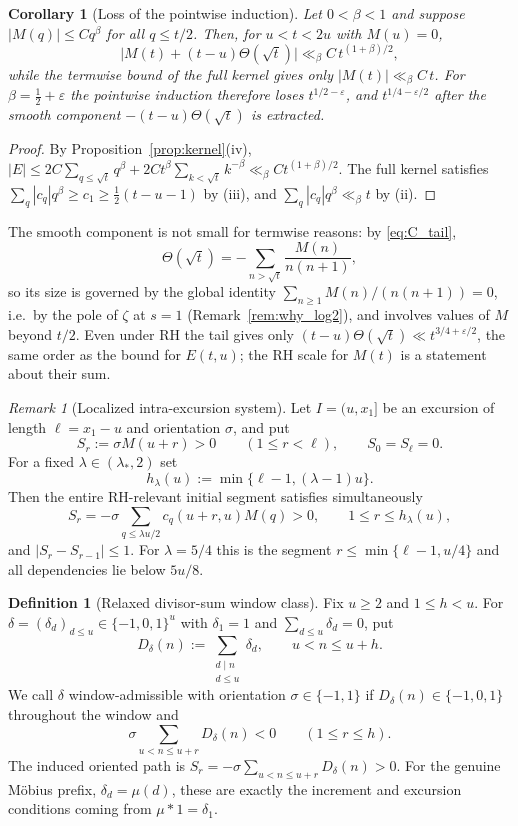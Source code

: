 \documentclass[11pt]{amsart}
\numberwithin{equation}{section}
\theoremstyle{plain}
\newtheorem{corollary}[theorem]{Corollary}
\theoremstyle{definition}
\newtheorem{definition}[theorem]{Definition}
\theoremstyle{remark}
\newtheorem{remark}[theorem]{Remark}
\newcommand{\eps}{\varepsilon}
\begin{document}
\begin{corollary}[Loss of the pointwise induction]
\label{cor:induction-loss}
Let $0<\beta<1$ and suppose $|M(q)|\le Cq^\beta$ for all $q\le t/2$. Then,
for $u<t<2u$ with $M(u)=0$,
\begin{equation}
\label{eq:induction-loss}
\bigl|M(t)+(t-u)\Theta(\sqrt t)\bigr|\ll_\beta C\,t^{(1+\beta)/2},
\end{equation}
while the termwise bound of the full kernel gives only
$|M(t)|\ll_\beta C\,t$. For $\beta=\frac12+\eps$ the pointwise induction
therefore loses $t^{1/2-\eps}$, and $t^{1/4-\eps/2}$ after the smooth
component $-(t-u)\Theta(\sqrt t)$ is extracted.
\end{corollary}

\begin{proof}
By Proposition~\ref{prop:kernel}(iv),
$|E|\le2C\sum_{q\le\sqrt t}q^\beta+2Ct^\beta\sum_{k<\sqrt t}k^{-\beta}
\ll_\beta Ct^{(1+\beta)/2}$. The full kernel satisfies
$\sum_q|c_q|q^\beta\ge c_1\ge\frac12(t-u-1)$ by (iii), and
$\sum_q|c_q|q^\beta\ll_\beta t$ by (ii).
\end{proof}

The smooth component is not small for termwise reasons: by
\eqref{eq:C_tail},
\[
\Theta(\sqrt t)=-\sum_{n>\sqrt t}\frac{M(n)}{n(n+1)},
\]
so its size is governed by the global identity
$\sum_{n\ge1}M(n)/(n(n+1))=0$, i.e.\ by the pole of $\zeta$ at $s=1$
(Remark~\ref{rem:why_log2}), and involves values of $M$ beyond $t/2$. Even
under RH the tail gives only $(t-u)\Theta(\sqrt t)\ll t^{3/4+\eps/2}$, the
same order as the bound for $E(t,u)$; the RH scale for $M(t)$ is a statement
about their sum.

\begin{remark}[Localized intra-excursion system]
\label{rem:sign-cone}
Let $I=(u,x_1]$ be an excursion of length $\ell=x_1-u$ and orientation
$\sigma$, and put
\[
S_r:=\sigma M(u+r)>0\qquad(1\le r<\ell),\qquad S_0=S_\ell=0.
\]
For a fixed $\lambda\in(\lambda_*,2)$ set
\[
h_\lambda(u):=\min\{\ell-1,(\lambda-1)u\}.
\]
Then the entire RH-relevant initial segment satisfies simultaneously
\[
S_r=-\sigma\sum_{q\le\lambda u/2}c_q(u+r,u)M(q)>0,
\qquad1\le r\le h_\lambda(u),
\]
and $|S_r-S_{r-1}|\le1$.  For $\lambda=5/4$ this is the segment
$r\le\min\{\ell-1,u/4\}$ and all dependencies lie below $5u/8$.
\end{remark}

\begin{definition}[Relaxed divisor-sum window class]
\label{def:relaxed-divisor-cone}
Fix $u\ge2$ and $1\le h<u$.  For
$\delta=(\delta_d)_{d\le u}\in\{-1,0,1\}^u$ with $\delta_1=1$ and
$\sum_{d\le u}\delta_d=0$, put
\[
D_\delta(n):=\sum_{\substack{d\mid n\\ d\le u}}\delta_d,
\qquad u<n\le u+h.
\]
We call $\delta$ window-admissible with orientation $\sigma\in\{-1,1\}$ if
$D_\delta(n)\in\{-1,0,1\}$ throughout the window and
\[
\sigma\sum_{u<n\le u+r}D_\delta(n)<0
\qquad(1\le r\le h).
\]
The induced oriented path is
$S_r=-\sigma\sum_{u<n\le u+r}D_\delta(n)>0$.
For the genuine M\"obius prefix, $\delta_d=\mu(d)$, these are exactly the
increment and excursion conditions coming from $\mu*1=\delta_1$.
\end{definition}
\end{document}

